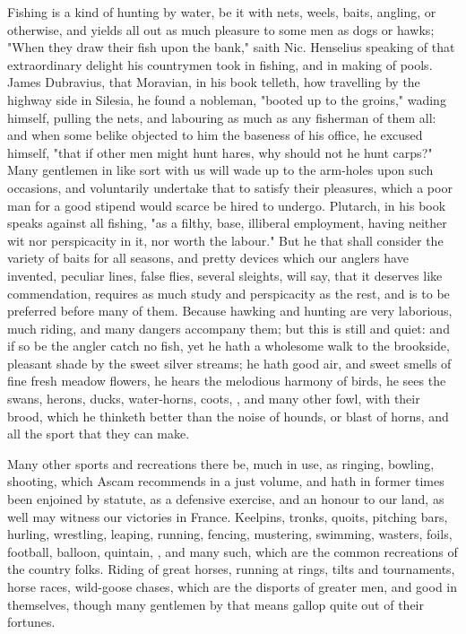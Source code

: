 {Fishing is a kind of hunting by water, be it with nets, weels, baits, angling, or otherwise, and yields all out as much pleasure to some men as dogs or hawks; "When they draw their fish upon the bank," saith Nic. Henselius  speaking of that extraordinary delight his countrymen took in fishing, and in making of pools. James Dubravius, that Moravian, in his book  telleth, how travelling by the highway side in Silesia, he found a nobleman, "booted up to the groins," wading himself, pulling the nets, and labouring as much as any fisherman of them all: and when some belike objected to him the baseness of his office, he excused himself, "that if other men might hunt hares, why should not he hunt carps?" Many gentlemen in like sort with us will wade up to the arm-holes upon such occasions, and voluntarily undertake that to satisfy their pleasures, which a poor man for a good stipend would scarce be hired to undergo. Plutarch, in his book  speaks against all fishing, "as a filthy, base, illiberal employment, having neither wit nor perspicacity in it, nor worth the labour." But he that shall consider the variety of baits for all seasons, and pretty devices which our anglers have invented, peculiar lines, false flies, several sleights, \etc{} will say, that it deserves like commendation, requires as much study and perspicacity as the rest, and is to be preferred before many of them. Because hawking and hunting are very laborious, much riding, and many dangers accompany them; but this is still and quiet: and if so be the angler catch no fish, yet he hath a wholesome walk to the brookside, pleasant shade by the sweet silver streams; he hath good air, and sweet smells of fine fresh meadow flowers, he hears the melodious harmony of birds, he sees the swans, herons, ducks, water-horns, coots, \etc{}, and many other fowl, with their brood, which he thinketh better than the noise of hounds, or blast of horns, and all the sport that they can make.

Many other sports and recreations there be, much in use, as ringing, bowling, shooting, which Ascam recommends in a just volume, and hath in former times been enjoined by statute, as a defensive exercise, and an honour to our land, as well may witness our victories in France. Keelpins, tronks, quoits, pitching bars, hurling, wrestling, leaping, running, fencing, mustering, swimming, wasters, foils, football, balloon, quintain, \etc{}, and many such, which are the common recreations of the country folks. Riding of great horses, running at rings, tilts and tournaments, horse races, wild-goose chases, which are the disports of greater men, and good in themselves, though many gentlemen by that means gallop quite out of their fortunes.

}
